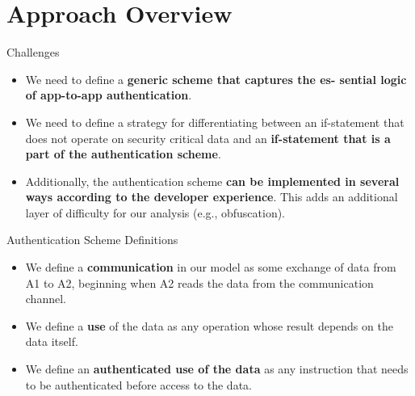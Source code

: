 \documentclass[10pt]{beamer}
\begin{document}
\section{Approach Overview}
\begin{frame}[fragile]{Challenges}

  \begin{itemize}

  \item We need to define a {\bf generic scheme that captures the es-
      sential logic of app-to-app authentication}.

  \item We need to define a strategy for differentiating between an
    if-statement that does not operate on security critical data and
    an {\bf if-statement that is a part of the authentication scheme}.

  \item Additionally, the authentication scheme {\bf can be
      implemented in several ways according to the developer
      experience}. This adds an additional layer of difficulty for our
      analysis (e.g., obfuscation).

  \end{itemize}
  
\end{frame}

\begin{frame}[fragile]{Authentication Scheme Definitions}

  \begin{itemize}

  \item We define a {\bf communication} in our model as some exchange
    of data from A1 to A2, beginning when A2 reads the data from the
    communication channel.

  \item We define a {\bf use} of the data as any operation whose
    result depends on the data itself.

  \item We define an {\bf authenticated use of the data} as any
    instruction that needs to be authenticated before access to the
    data.
      
  \end{itemize}

  
\end{frame}
\end{document}
